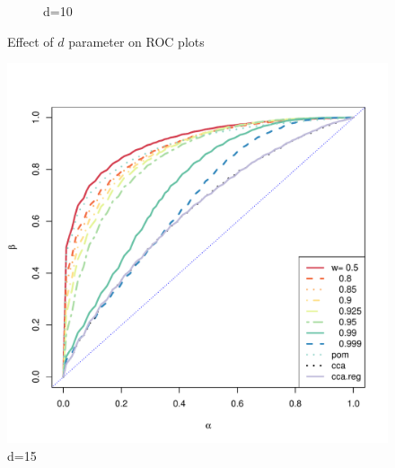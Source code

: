\documentclass[12pt,oneside,final]{thesis}\usepackage[]{graphicx}\usepackage[]{color}
\begin{document}
\begin{figure}
\begin{subfigure}[b]{0.47\textwidth}
                \caption{d=10}
                \label{fig:ROC-d-10}
        \end{subfigure}
         
        \caption{Effect of $d$ parameter on ROC plots}\label{fig:ROC-d}
        \label{fig:ROC-d}

\end{figure}

\begin{center}
\begin{figure}

                \centering
               \includegraphics[scale=0.75]{ROC-d-15.pdf}
                \caption{d=15}
                \label{fig:ROC-d-15}
       
\end{figure}
\end{center}
\end{document}
